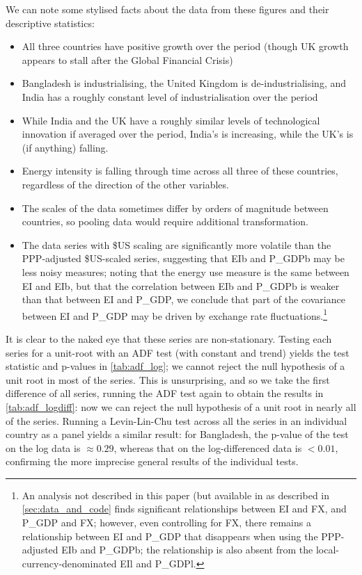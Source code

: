 \documentclass[11pt,a4paper]{article}
\begin{document}
We can note some stylised facts about the data from these figures and their descriptive statistics:
\begin{itemize}

\item All three countries have positive growth over the period (though UK growth appears to stall  after the Global Financial Crisis)
\item Bangladesh is industrialising, the United Kingdom is de-industrialising, and India has a roughly constant level of industrialisation over the period
\item While India and the UK have a roughly similar levels of technological innovation if averaged over the period, India's is increasing, while the UK's is (if anything) falling.
\item Energy intensity is falling through time across all three of these countries, regardless of the direction of the other variables.
\item The scales of the data sometimes differ by orders of magnitude between countries, so pooling data would require additional transformation.
\item The data series with \$US scaling are significantly more volatile than the PPP-adjusted \$US-scaled series, suggesting that EIb and P\_GDPb may be less noisy measures; noting that the energy use measure is the same between EI and EIb, but that the correlation between EIb and P\_GDPb is weaker than that between EI and P\_GDP, we conclude that part of the covariance between EI and P\_GDP may be driven by exchange rate fluctuations.\footnote{
An analysis not described in this paper (but available in as described in \cref{sec:data_and_code} finds significant relationships between EI and FX, and P\_GDP and FX; however, even controlling for FX, there remains a relationship between EI and P\_GDP that disappears when using the PPP-adjusted EIb and P\_GDPb; the relationship is also absent from the local-currency-denominated EIl and P\_GDPl.
}
\end{itemize}
It is clear to the naked eye that these series are non-stationary.
Testing each series for a unit-root with an ADF test (with constant and trend) yields the test statistic and p-values in \cref{tab:adf_log}; we cannot reject the null hypothesis of a unit root in most of the series.
This is unsurprising, and so we take the first difference of all series, running the ADF test again to obtain the results in \cref{tab:adf_logdiff}: now we can reject the null hypothesis of a unit root in nearly all of the series.
Running a Levin-Lin-Chu test across all the series in an individual country as a panel yields a similar result: for Bangladesh, the p-value of the test on the log data is $\approx0.29$, whereas that on the log-differenced data is $<0.01$, confirming the more imprecise general results of the individual tests.
\end{document}
